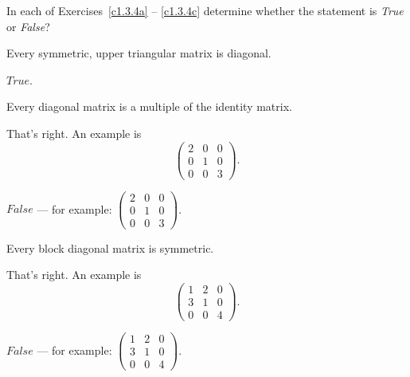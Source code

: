 \documentclass{ximera}
\begin{document}
\noindent In each of Exercises~\ref{c1.3.4a} -- \ref{c1.3.4c} determine
whether the statement is {\em True\/} or {\em False\/}?
\begin{exercise} \label{c1.3.4a}
  Every symmetric, upper triangular matrix is diagonal.
  \begin{multipleChoice}
  \end{multipleChoice}

\begin{solution}
$True$.

\end{solution}
\end{exercise}
\begin{exercise} \label{c1.3.4b}
  Every diagonal matrix is a multiple of the identity matrix.
  \begin{multipleChoice}
  \end{multipleChoice}
  \begin{feedback}
    That's right.   An example is
    \[\left(\begin{array}{ccc}
              2 & 0 & 0 \\
              0 & 1 & 0 \\
              0 & 0 & 3 \end{array}\right).\]
  \end{feedback}

\begin{solution}
$False$ --- for example:
$\left(\begin{array}{ccc}
2 & 0 & 0 \\
0 & 1 & 0 \\
0 & 0 & 3 \end{array}\right)$.

\end{solution}
\end{exercise}
\begin{exercise} \label{c1.3.4c}
  Every block diagonal matrix is symmetric.
  \begin{multipleChoice}
  \end{multipleChoice}
  \begin{feedback}
    That's right.   An example is
    \[ \left(\begin{array}{ccc}
               1 & 2 & 0 \\
               3 & 1 & 0 \\
               0 & 0 & 4
             \end{array}\right).
         \]
  \end{feedback}  

\begin{solution}
$False$ --- for example:
$\left(\begin{array}{ccc}
1 & 2 & 0 \\
3 & 1 & 0 \\
0 & 0 & 4
\end{array}\right)$.

\end{solution}
\end{exercise}
\end{document}
